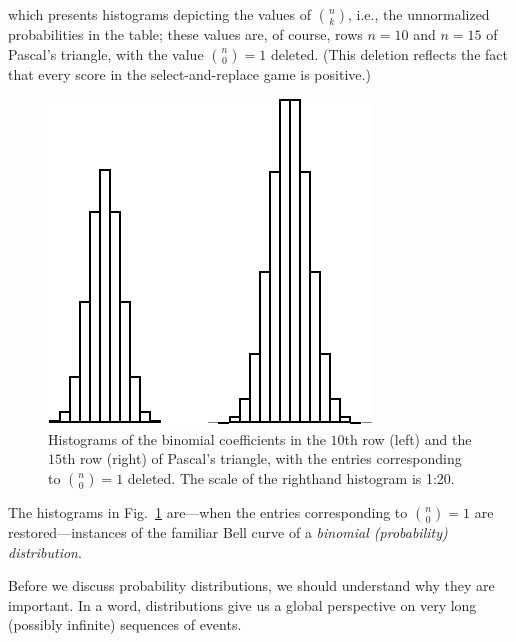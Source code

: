which presents histograms depicting the values of $\displaystyle {n \choose k}$,
i.e., the unnormalized probabilities in the table; these values are, of course,
rows $n =10$ and $n=15$ of Pascal's triangle, with the value
$\displaystyle {n \choose 0} = 1$ deleted.  (This deletion reflects the fact that every
score in the {\sc select-and-replace} game is positive.)
\begin{figure}[htb]
\begin{center}
        \includegraphics[scale=0.5]{FiguresMaths/ProbaGaussianDistribution}
        \caption{Histograms of the binomial coefficients in the $10$th row (left) and the $15$th
         row (right) of Pascal's triangle, with the entries corresponding to
         $\displaystyle {n \choose 0} = 1$ deleted.
         The scale of the righthand histogram is 1:20.}
        \label{fig:gaussiandistribution}
\end{center}
\end{figure}

 
 

The histograms in Fig.~\ref{fig:gaussiandistribution} are---when the entries 
corresponding to $\displaystyle {n \choose 0} = 1$ are restored---instances of the
familiar Bell curve of a {\em binomial (probability) distribution}.

\medskip

Before we discuss probability distributions, we should understand why
they are important.  In a word, distributions give us a global
perspective on very long (possibly infinite) sequences of events.

